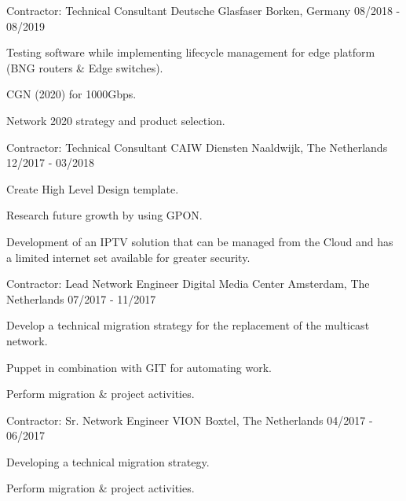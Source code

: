 \begin{cventries}
{\begin{cvitems}
      \end{cvitems}
}
 \cventry
    {Contractor: Technical Consultant} %
    {Deutsche Glasfaser} %
    {Borken, Germany} %
    {08/2018 - 08/2019} %
{
      \begin{cvitems} %
      \item {Testing software while implementing lifecycle management for edge platform (BNG routers \& Edge switches).}
      \item {CGN (2020) for 1000Gbps.}
      \item {Network 2020 strategy and product selection.} 
      \end{cvitems}
}
 \cventry
    {Contractor: Technical Consultant} %
    {CAIW Diensten} %
    {Naaldwijk, The Netherlands} %
    {12/2017 - 03/2018} %
	{
      \begin{cvitems} %
    \item {Create High Level Design template.}
    \item {Research future growth by using GPON.}
    \item {Development of an IPTV solution that can be managed from the Cloud and has a limited internet set available for greater security.}
      \end{cvitems}
}

  \cventry
	{Contractor: Lead Network Engineer} %
	{Digital Media Center} %
	{Amsterdam, The Netherlands} %
	{07/2017 - 11/2017} %
    {
      \begin{cvitems} %
         \item {Develop a technical migration strategy for the replacement of the multicast network.}
   	 \item {Puppet in combination with GIT for automating work.}
	 \item {Perform migration \& project activities.}
      \end{cvitems}
    }

  \cventry
	{Contractor: Sr. Network Engineer} %
	{VION} %
	{Boxtel, The Netherlands} %
	{04/2017 - 06/2017} %
    {
      \begin{cvitems} %
          \item {Developing a technical migration strategy.}
	  \item {Perform migration \& project activities.}	
      \end{cvitems}
    }


\end{cventries}
